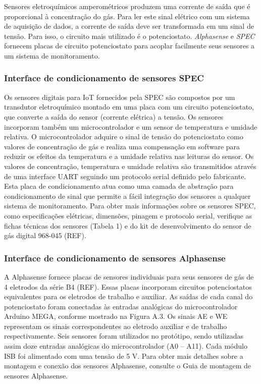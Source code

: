 Sensores eletroquímicos amperométricos produzem uma corrente de saída que é proporcional à concentração do gás. Para ler este sinal elétrico com um sistema de aquisição de dados, a corrente de saída deve ser transformada em um sinal de tensão. Para isso, o circuito mais utilizado é o potenciostato. \textit{Alphasense} e \textit{SPEC} fornecem placas de circuito potenciostato para acoplar facilmente seus sensores a um sistema de monitoramento.

\subsubsection{Interface de condicionamento de sensores SPEC}

Os sensores digitais para IoT fornecidos pela SPEC são compostos por um transdutor eletroquímico montado em uma placa com um circuito potenciostato, que converte a saída do sensor (corrente elétrica) a tensão. Os sensores incorporam também um microcontrolador e um sensor de temperatura e umidade relativa. O microcontrolador adquire o sinal de tensão do potenciostato como valores de concentração de gás e realiza uma compensação em software para reduzir os efeitos da temperatura e a umidade relativa nas leituras do sensor. Os valores de concentração, temperatura e umidade relativa são transmitidos através de uma interface UART seguindo um protocolo serial definido pelo fabricante. Esta placa de condicionamento atua como uma camada de abstração para condicionamento de sinal que permite a fácil integração dos sensores a qualquer sistema de monitoramento. Para obter mais informações sobre os sensores SPEC, como especificações elétricas, dimensões, pinagem e protocolo serial, verifique as fichas técnicas dos sensores (Tabela 1) e do kit de desenvolvimento do sensor de gás digital 968-045 (REF).

\subsubsection{Interface de condicionamento de sensores Alphasense}

A Alphasense fornece placas de sensores individuais para seus sensores de gás de 4 eletrodos da série B4 (REF). Essas placas incorporam circuitos potenciostatos equivalentes para os eletrodos de trabalho e auxiliar. As saídas de cada canal do potenciostato foram conectadas às entradas analógicas do microcontrolador Arduino MEGA, conforme mostrado na Figura A.3. Os sinais AE e WE representam os sinais correspondentes ao eletrodo auxiliar e de trabalho respectivamente. Seis sensores foram utilizados no protótipo, sendo utilizadas assim doze entradas analógicas do microcontrolador (A0 – A11). Cada módulo ISB foi alimentado com uma tensão de 5 V. Para obter mais detalhes sobre a montagem e conexão dos sensores Alphasense, consulte o Guia de montagem de sensores Alphasense.

